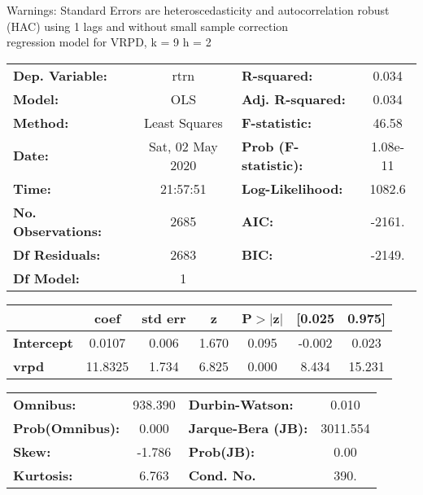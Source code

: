 Warnings: \newline
 [1] Standard Errors are heteroscedasticity and autocorrelation robust (HAC) using 1 lags and without small sample correction\\ 

regression model for VRPD, k = 9 h = 2\begin{center}
\begin{tabular}{lclc}
\toprule
\textbf{Dep. Variable:}    &       rtrn       & \textbf{  R-squared:         } &     0.034   \\
\textbf{Model:}            &       OLS        & \textbf{  Adj. R-squared:    } &     0.034   \\
\textbf{Method:}           &  Least Squares   & \textbf{  F-statistic:       } &     46.58   \\
\textbf{Date:}             & Sat, 02 May 2020 & \textbf{  Prob (F-statistic):} &  1.08e-11   \\
\textbf{Time:}             &     21:57:51     & \textbf{  Log-Likelihood:    } &    1082.6   \\
\textbf{No. Observations:} &        2685      & \textbf{  AIC:               } &    -2161.   \\
\textbf{Df Residuals:}     &        2683      & \textbf{  BIC:               } &    -2149.   \\
\textbf{Df Model:}         &           1      & \textbf{                     } &             \\
\bottomrule
\end{tabular}
\begin{tabular}{lcccccc}
                   & \textbf{coef} & \textbf{std err} & \textbf{z} & \textbf{P$> |$z$|$} & \textbf{[0.025} & \textbf{0.975]}  \\
\midrule
\textbf{Intercept} &       0.0107  &        0.006     &     1.670  &         0.095        &       -0.002    &        0.023     \\
\textbf{vrpd}      &      11.8325  &        1.734     &     6.825  &         0.000        &        8.434    &       15.231     \\
\bottomrule
\end{tabular}
\begin{tabular}{lclc}
\textbf{Omnibus:}       & 938.390 & \textbf{  Durbin-Watson:     } &    0.010  \\
\textbf{Prob(Omnibus):} &   0.000 & \textbf{  Jarque-Bera (JB):  } & 3011.554  \\
\textbf{Skew:}          &  -1.786 & \textbf{  Prob(JB):          } &     0.00  \\
\textbf{Kurtosis:}      &   6.763 & \textbf{  Cond. No.          } &     390.  \\
\bottomrule
\end{tabular}
\end{center}

